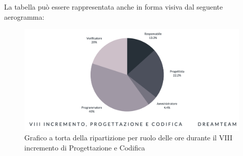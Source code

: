 La tabella può essere rappresentata anche in forma visiva dal seguente aerogramma:
\begin{figure}[H]
\centering
\includegraphics[scale=0.50]{Sezioni/SezioniPreventivo/grafici/progettazione/Progettazione_VIII_incremento_costi.png}
\caption{Grafico a torta della ripartizione per ruolo delle ore durante il VIII incremento di Progettazione e Codifica}
\end{figure}

\pagebreak


